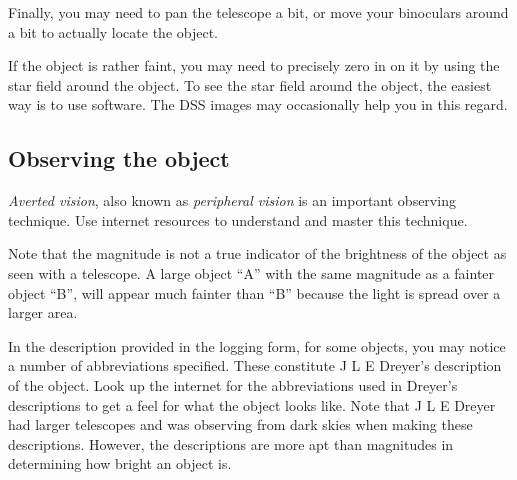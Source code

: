 Finally, you may need to pan the telescope a bit, or move your
binoculars around a bit to actually locate the object.

If the object is rather faint, you may need to precisely zero in on it
by using the star field around the object. To see the star field
around the object, the easiest way is to use software. The DSS images
may occasionally help you in this regard.

\subsection{Observing the object}

\emph{Averted vision}, also known as \emph{peripheral vision} is an
important observing technique. Use internet resources to understand
and master this technique.

Note that the magnitude is not a true indicator of the brightness of
the object as seen with a telescope. A large object ``A'' with the
same magnitude as a fainter object ``B'', will appear much fainter
than ``B'' because the light is spread over a larger area.

In the description provided in the logging form, for some objects, you
may notice a number of abbreviations specified. These constitute J L E
Dreyer's description of the object. Look up the internet for the
abbreviations used in Dreyer's descriptions to get a feel for what the
object looks like. Note that J L E Dreyer had larger telescopes and
was observing from dark skies when making these descriptions. However,
the descriptions are more apt than magnitudes in determining how
bright an object is.

